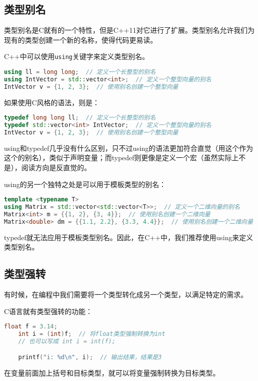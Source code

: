 \documentclass[../main.tex]{subfiles}
\begin{document}
\subsection{类型别名}

类型别名是C就有的一个特性，但是C++11对它进行了扩展。类型别名允许我们为现有的类型创建一个新的名称，使得代码更易读。

C++中可以使用\texttt{using}关键字来定义类型别名。
\begin{lstlisting}[language=C++]
using ll = long long;  // 定义一个长整型的别名
using IntVector = std::vector<int>;  // 定义一个整型向量的别名
IntVector v = {1, 2, 3};  // 使用别名创建一个整型向量
\end{lstlisting}

如果使用C风格的语法，则是：
\begin{lstlisting}[language=C++]
typedef long long ll;  // 定义一个长整型的别名
typedef std::vector<int> IntVector;  // 定义一个整型向量的别名
IntVector v = {1, 2, 3};  // 使用别名创建一个整型向量
\end{lstlisting}

using和typedef几乎没有什么区别，只不过using的语法更加符合直觉（用这个作为这个的别名），类似于声明变量；而typedef则更像是定义一个宏（虽然实际上不是），阅读方向是反直觉的。

using的另一个独特之处是可以用于模板类型的别名：
\begin{lstlisting}[language=C++]
template <typename T>
using Matrix = std::vector<std::vector<T>>;  // 定义一个二维向量的别名
Matrix<int> m = {{1, 2}, {3, 4}};  // 使用别名创建一个二维向量
Matrix<double> dm = {{1.1, 2.2}, {3.3, 4.4}};  // 使用别名创建一个二维向量
\end{lstlisting}
typedef就无法应用于模板类型别名。因此，在C++中，我们推荐使用using来定义类型别名。

\subsection{类型强转}

有时候，在编程中我们需要将一个类型转化成另一个类型，以满足特定的需求。

C语言就有类型强转的功能：
\begin{lstlisting}[language=C++]
    float f = 3.14;
    int i = (int)f;  // 将float类型强制转换为int
    // 也可以写成 int i = int(f);

    printf("i: %d\n", i);  // 输出结果，结果是3
\end{lstlisting}
在变量前面加上括号和目标类型，就可以将变量强制转换为目标类型。
\end{document}
